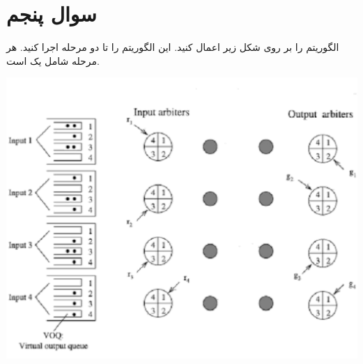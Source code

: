 \section{سوال پنجم}

الگوریتم  را بر روی شکل زیر اعمال کنید. این الگوریتم را تا دو مرحله اجرا کنید. هر مرحله شامل یک  است.

\begin{center}
	\includegraphics*[width=1\linewidth]{pics/img3.png}
	\label{شکل مورد نظر}
\end{center}